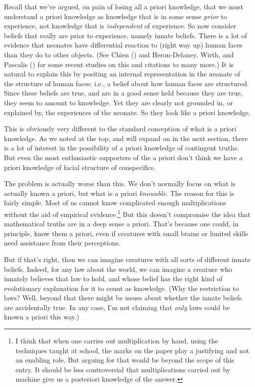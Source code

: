 \documentclass[
  10pt,
  letterpaper,
  DIV=11,
  numbers=noendperiod,
  twoside]{scrartcl}
\begin{document}
Recall that we've argued, on pain of losing all a priori knowledge, that
we must understand a priori knowledge as knowledge that is in some sense
\emph{prior} to experience, not knowledge that is \emph{independent} of
experience. So now consider beliefs that really are prior to experience,
namely innate beliefs. There is a lot of evidence that neonates have
differential reaction to (right way up) human faces than they do to
other objects. (See Chien () and
Heron-Delaney, Wirth, and Pascalis
() for some recent studies on this
and citations to many more.) It is natural to explain this by positing
an internal representation in the neonate of the structure of human
faces; i.e., a belief about how human faces are structured. Since these
beliefs are true, and are in a good sense held because they are true,
they seem to amount to knowledge. Yet they are clearly not grounded in,
or explained by, the experiences of the neonate. So they look like a
priori knowledge.

This is obviously very different to the standard conception of what is a
priori knowledge. As we noted at the top, and will expand on in the next
section, there is a lot of interest in the possibility of a priori
knowledge of contingent truths. But even the most enthusiastic
supporters of the a priori don't think we have a priori knowledge of
facial structure of conspecifics.

The problem is actually worse than this. We don't normally focus on what
is actually known a priori, but what is a priori \emph{knowable}. The
reason for this is fairly simple. Most of us cannot know complicated
enough multiplications without the aid of empirical evidence.\footnote{I
  think that when one carries out multiplication by hand, using the
  techniques taught at school, the marks on the paper play a justifying
  and not an enabling role. But arguing for that would be beyond the
  scope of this entry. It should be less controversial that
  multiplications carried out by machine give us a posteriori knowledge
  of the answer.} But this doesn't compromise the idea that mathematical
truths are in a deep sense a priori. That's because one could, in
principle, know them a priori, even if creatures with small brains or
limited skills need assistance from their perceptions.

But if that's right, then we can imagine creatures with all sorts of
different innate beliefs. Indeed, for any law about the world, we can
imagine a creature who innately believes that law to hold, and whose
belief has the right kind of evolutionary explanation for it to count as
knowledge. (Why the restriction to laws? Well, beyond that there might
be issues about whether the innate beliefs are accidentally true. In any
case, I'm not claiming that \emph{only} laws could be known a priori
this way.)
\end{document}
